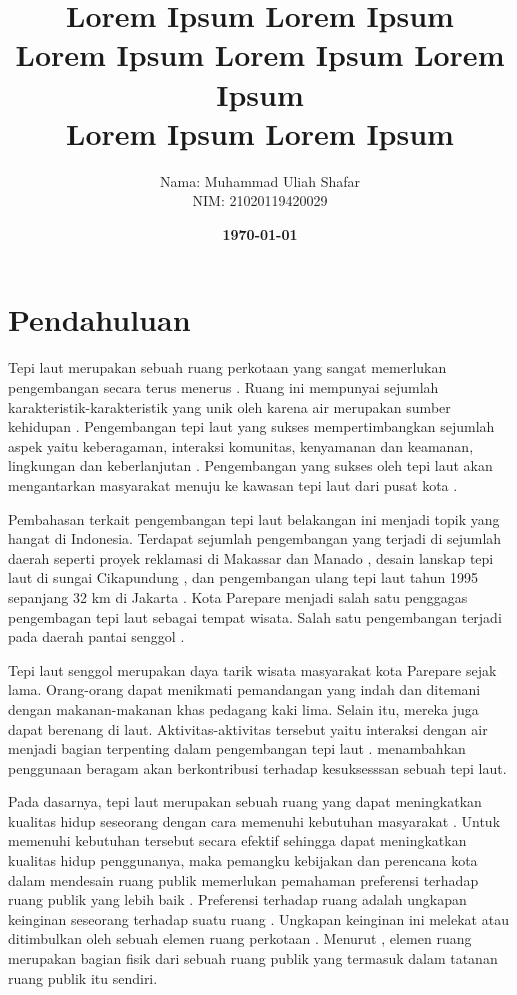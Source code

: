 \documentclass[11pt]{udthesis} %
\title{
\textbf{Lorem Ipsum Lorem Ipsum \\
Lorem Ipsum Lorem Ipsum Lorem Ipsum} \\
\textbf{{Lorem Ipsum Lorem Ipsum \\}}
} %
\date{\textbf{\today}}
\author{
\begin{tabular}{@{}ll@{}}
	Nama & : Muhammad Uliah Shafar\\
	NIM & : 21020119420029\\
\end{tabular}
}
\begin{document}
\section{Pendahuluan}

Tepi laut merupakan sebuah ruang perkotaan yang sangat memerlukan pengembangan secara terus menerus \citep{shamsuddin2013}. Ruang ini mempunyai sejumlah karakteristik-karakteristik yang unik oleh karena air merupakan sumber kehidupan \citep{yassin2010}. Pengembangan tepi laut yang sukses mempertimbangkan sejumlah aspek yaitu keberagaman, interaksi komunitas, kenyamanan dan keamanan, lingkungan dan keberlanjutan \citep{hussein2014}. Pengembangan yang sukses oleh tepi laut akan mengantarkan masyarakat menuju ke kawasan tepi laut dari pusat kota \citep{hoyle2001}.

Pembahasan terkait pengembangan tepi laut belakangan ini menjadi topik yang hangat di Indonesia. Terdapat sejumlah pengembangan yang terjadi di sejumlah daerah seperti proyek reklamasi di Makassar dan Manado \citep{andi2017,fhuh2017,tungka2012}, desain lanskap tepi laut di sungai Cikapundung \citep{ainy2016}, dan pengembangan ulang tepi laut tahun 1995 sepanjang 32 km di Jakarta \citep{pramesti2017}. Kota Parepare menjadi salah satu penggagas pengembagan tepi laut sebagai tempat wisata. Salah satu pengembangan terjadi pada daerah pantai senggol \citep{tri2020}.

Tepi laut senggol merupakan daya tarik wisata masyarakat kota Parepare sejak lama. Orang-orang dapat menikmati pemandangan yang indah dan ditemani dengan makanan-makanan khas pedagang kaki lima. Selain itu, mereka juga dapat berenang di laut. Aktivitas-aktivitas tersebut yaitu interaksi dengan air menjadi bagian terpenting dalam pengembangan tepi laut \citep{davidowich1998}. \cite{eldeeb2015} menambahkan penggunaan beragam akan berkontribusi terhadap kesuksesssan sebuah tepi laut.

Pada dasarnya, tepi laut merupakan sebuah ruang yang dapat meningkatkan kualitas hidup seseorang dengan cara memenuhi kebutuhan masyarakat \citep{kim2012}.
Untuk memenuhi kebutuhan tersebut secara efektif sehingga dapat meningkatkan kualitas hidup penggunanya, maka pemangku kebijakan dan perencana kota dalam mendesain ruang publik memerlukan pemahaman preferensi terhadap ruang publik yang lebih baik \citep{madureira2018}.
Preferensi terhadap ruang adalah ungkapan keinginan seseorang terhadap suatu ruang \citep{zhang2006}. Ungkapan keinginan ini melekat atau ditimbulkan oleh sebuah elemen ruang perkotaan \citep{knox2014}. Menurut \cite{alves2008}, elemen ruang merupakan bagian fisik dari sebuah ruang publik yang termasuk dalam tatanan ruang publik itu sendiri.
\end{document}
